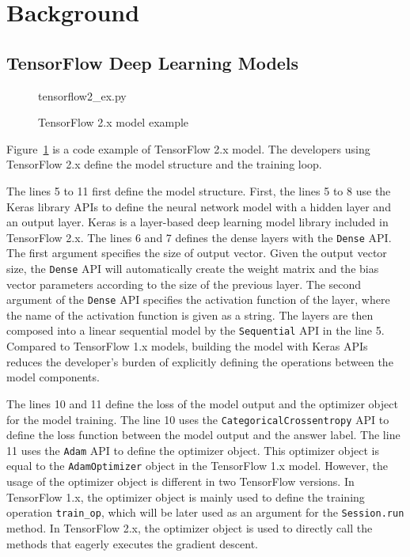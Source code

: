 \section{Background}\label{sec:background}

\subsection{TensorFlow Deep Learning Models}


\begin{figure}[ht!]

{tensorflow2_ex.py}
  \caption{TensorFlow 2.x model example}
\label{fig:back:tf2}
\end{figure}

Figure~\ref{fig:back:tf2} is a code example of TensorFlow 2.x model.
The developers using TensorFlow 2.x define the model structure and the training
loop. 

The lines 5 to 11 first define the model structure.
First, the lines 5 to 8 use the Keras library APIs to define the neural
network model with a hidden layer and an output layer.
Keras is a layer-based deep learning model library included in TensorFlow 2.x.
The lines 6 and 7 defines the dense layers with the {\tt Dense} API.
The first argument specifies the size of output vector.
Given the output vector size, the {\tt Dense} API will automatically create
the weight matrix and the bias vector parameters according to the size of 
the previous layer.
The second argument of the {\tt Dense} API 
specifies the activation function of the layer,
where the name of the activation function is given as a string. 
The layers are then composed into a linear sequential model
by the {\tt Sequential} API in the line 5.
Compared to TensorFlow 1.x models, building the model with Keras APIs
reduces the developer's burden of explicitly defining the operations between 
the model components.

The lines 10 and 11 define the loss of the model output and
the optimizer object for the model training.
The line 10 uses the {\tt CategoricalCrossentropy} API to 
define the loss function between the model output and the answer label.
The line 11 uses the {\tt Adam} API to define the optimizer object.
This optimizer object is equal to the {\tt AdamOptimizer} object in the 
TensorFlow 1.x model.
However, the usage of the optimizer object is different in two TensorFlow
versions.
In TensorFlow 1.x, the optimizer object is mainly used to define the
training operation {\tt train\_op}, which will be later used as an argument
for the {\tt Session.run} method.
In TensorFlow 2.x, the optimizer object is used to directly call the methods 
that eagerly executes the gradient descent.


